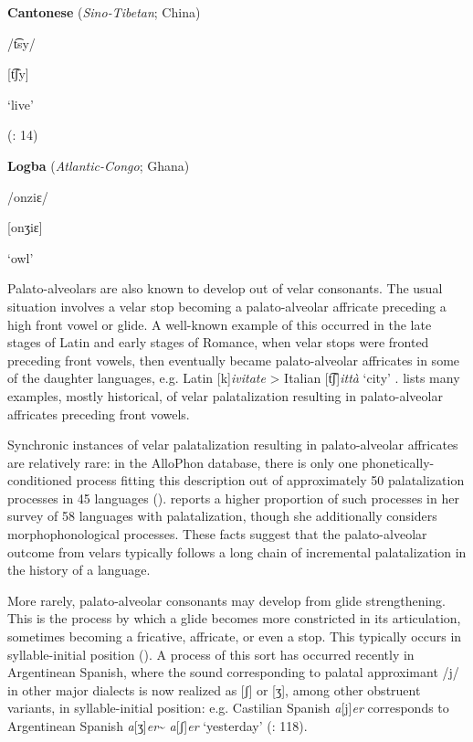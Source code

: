 \ea\label{ex:(4.36)}
  \textbf{Cantonese} (\textit{Sino-Tibetan}; China)

/t͡sy/

[t͡ʃy]

\glt ‘live’

(\citealt{MatthewsYip1994}: 14)

\z

\ea\label{ex:(4.37)}
  \textbf{Logba} (\textit{Atlantic-Congo}; Ghana)

/onziɛ/

[onʒiɛ]

\glt ‘owl’

\citep[18]{Dorvlo2008}

\z

  Palato-alveolars are also known to develop out of velar consonants. The usual situation involves a velar stop becoming a palato-alveolar affricate preceding a high front vowel or glide. A well-known example of this occurred in the late stages of Latin and early stages of Romance, when velar stops were fronted preceding front vowels, then eventually became palato-alveolar affricates in some of the daughter languages, e.g. Latin [k]\textit{ivitate} > Italian [t͡ʃ]\textit{ittà} ‘city’ \citep[113]{Posner1996}. \citet{Bhat1978} lists many examples, mostly historical, of velar palatalization resulting in palato-alveolar affricates preceding front vowels.

  Synchronic instances of velar palatalization resulting in palato-alveolar affricates are relatively rare: in the AlloPhon database, there is only one phonetically-conditioned process fitting this description out of approximately 50 palatalization processes in 45 languages (\citealt{BybeeEasterday2019}). \citet{Bateman2007} reports a higher proportion of such processes in her survey of 58 languages with palatalization, though she additionally considers morphophonological processes. These facts suggest that the palato-alveolar outcome from velars typically follows a long chain of incremental palatalization in the history of a language.

  More rarely, palato-alveolar consonants may develop from glide strengthening. This is the process by which a glide becomes more constricted in its articulation, sometimes becoming a fricative, affricate, or even a stop. This typically occurs in syllable-initial position (\citealt{BybeeEasterday2019}). A process of this sort has occurred recently in Argentinean Spanish, where the sound corresponding to palatal approximant /j/ in other major dialects is now realized as [ʃ] or [ʒ], among other obstruent variants, in syllable-initial position: e.g. Castilian Spanish \textit{a}[j]\textit{er} corresponds to Argentinean Spanish \textit{a}[ʒ]\textit{er}{\textasciitilde} \textit{a}[ʃ]\textit{er} ‘yesterday’ (\citealt{HarrisKaisse1999}: 118).

